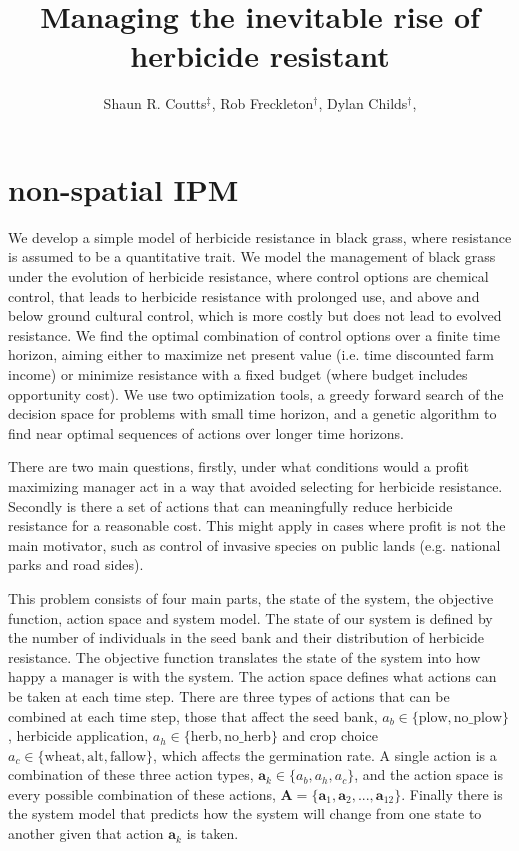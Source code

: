 \documentclass[12pt, a4paper]{article}
\begin{document}
\title{Managing the inevitable rise of herbicide resistant}
\author{Shaun R. Coutts$^\ddag$, Rob Freckleton$^\dag$, Dylan Childs$^\dag$, }
\maketitle
\section{non-spatial IPM}
We develop a simple model of herbicide resistance in black grass, where resistance is assumed to be a quantitative trait. We model the management of black grass under the evolution of herbicide resistance, where control options are chemical control, that leads to herbicide resistance with prolonged use, and above and below ground cultural control, which is more costly but does not lead to evolved resistance. We find the optimal combination of control options over a finite time horizon, aiming either to maximize net present value (i.e. time discounted farm income) or minimize resistance with a fixed budget (where budget includes opportunity cost). We use two optimization tools, a greedy forward search of the decision space for problems with small time horizon, and a genetic algorithm to find near optimal sequences of actions over longer time horizons.

There are two main questions, firstly, under what conditions would a profit maximizing manager act in a way that avoided selecting for herbicide resistance. Secondly is there a set of actions that can meaningfully reduce herbicide resistance for a reasonable cost. This might apply in cases where profit is not the main motivator, such as control of invasive species on public lands (e.g. national parks and road sides).                  

This problem consists of four main parts, the state of the system, the objective function, action space and system model. The state of our system is defined by the number of individuals in the seed bank and their distribution of herbicide resistance. The objective function translates the state of the system into how happy a manager is with the system. The action space defines what actions can be taken at each time step. There are three types of actions that can be combined at each time step, those that affect the seed bank, $a_b \in \{\text{plow}, \text{no\_plow}\}$, herbicide application, $a_h \in \{\text{herb}, \text{no\_herb}\}$ and crop choice $a_c \in \{\text{wheat}, \text{alt}, \text{fallow}\}$, which affects the germination rate. A single action is a combination of these three action types, $\textbf{a}_k \in \{a_b, a_h, a_c\}$, and the action space is every possible combination of these actions, $\textbf{A} = \{\textbf{a}_1, \textbf{a}_2, ..., \textbf{a}_{12}\}$. Finally there is the system model that predicts how the system will change from one state to another given that action $\textbf{a}_k$ is taken.        
\end{document}
